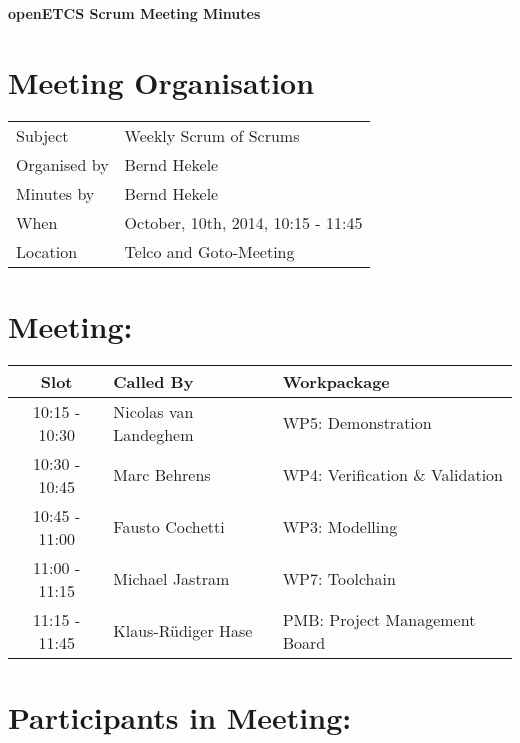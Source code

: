 \documentclass[a4paper, 11pt]{article}
\begin{document}
{\begin{center}\huge\bf openETCS Scrum Meeting Minutes\end{center}}
\section{Meeting Organisation}

\renewcommand{\arraystretch}{1.5}
\begin{supertabular}{m{.2\textwidth}m{.8\textwidth}}
Subject & Weekly Scrum of Scrums\\
Organised by &Bernd Hekele\\
Minutes by & Bernd Hekele\\
When & October, 10th, 2014, 10:15 - 11:45\\
Location & Telco and Goto-Meeting\\
\end{supertabular}

\renewcommand{\arraystretch}{1.0}
\section{Meeting:}

\begin{tabular}{|c|l|l|}
\hline
\textbf{Slot} &  \textbf{Called By} & \textbf{Workpackage} \\
\hline  
10:15 - 10:30 & Nicolas van Landeghem & WP5: Demonstration \\\hline  
10:30 - 10:45 & Marc Behrens & WP4: Verification \& Validation \\\hline  
10:45 - 11:00 & Fausto Cochetti & WP3: Modelling \\\hline  
11:00 - 11:15 & Michael Jastram & WP7: Toolchain \\\hline
11:15 - 11:45 & Klaus-R\"udiger Hase & PMB: Project Management Board \\\hline  
\end{tabular}

\section{Participants in Meeting:}
\end{document}
